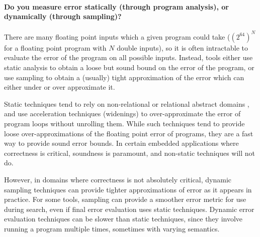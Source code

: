\documentclass[main.tex]{subfiles}
\begin{document}
\paragraph{Do you measure error statically (through program analysis), or
  dynamically (through sampling)?}

There are many floating point inputs which a given program could take
($\left(2^{64}\right)^N$ for a floating point program with $N$ double inputs), so
it is often intractable to evaluate the error of the program on all
possible inputs. Instead, tools either use static analysis to obtain a
loose but sound bound on the error of the program, or use sampling to
obtain a (usually) tight approximation of the error which can either
under or over approximate it.

Static techniques tend to rely on non-relational \cite{} or relational
abstract domains \cite{}, and use acceleration techniques (widenings)
to over-approximate the error of program loops without unrolling
them. While such techniques tend to provide loose over-approximations
of the floating point error of programs, they are a fast way to
provide sound error bounds. In certain embedded applications where
correctness is critical, soundness is paramount, and non-static
techniques will not do.

However, in domains where correctness is not absolutely critical,
dynamic sampling techniques can provide tighter approximations of
error as it appears in practice. For some tools, sampling can provide
a smoother error metric for use during search, even if final error
evaluation uses static techniques. Dynamic error evaluation techniques
can be slower than static techniques, since they involve running a
program multiple times, sometimes with varying semantics.


\end{document}
